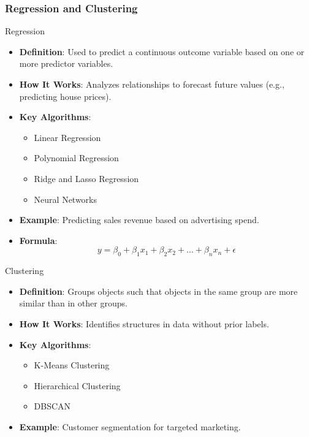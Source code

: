 \documentclass[aspectratio=169]{beamer}
\begin{document}
\begin{frame}[fragile]
    \frametitle{Regression and Clustering}
    \begin{block}{Regression}
        \begin{itemize}
            \item \textbf{Definition}: Used to predict a continuous outcome variable based on one or more predictor variables.
            \item \textbf{How It Works}: Analyzes relationships to forecast future values (e.g., predicting house prices).
            \item \textbf{Key Algorithms}:
            \begin{itemize}
                \item Linear Regression
                \item Polynomial Regression
                \item Ridge and Lasso Regression
                \item Neural Networks
            \end{itemize}
            \item \textbf{Example}: Predicting sales revenue based on advertising spend.
            \item \textbf{Formula}:
            \begin{equation}
                y = \beta_0 + \beta_1 x_1 + \beta_2 x_2 + \ldots + \beta_n x_n + \epsilon
            \end{equation}
        \end{itemize}
    \end{block}

    \begin{block}{Clustering}
        \begin{itemize}
            \item \textbf{Definition}: Groups objects such that objects in the same group are more similar than in other groups.
            \item \textbf{How It Works}: Identifies structures in data without prior labels.
            \item \textbf{Key Algorithms}:
            \begin{itemize}
                \item K-Means Clustering
                \item Hierarchical Clustering
                \item DBSCAN
            \end{itemize}
            \item \textbf{Example}: Customer segmentation for targeted marketing.
        \end{itemize}
    \end{block}
\end{frame}
\end{document}

